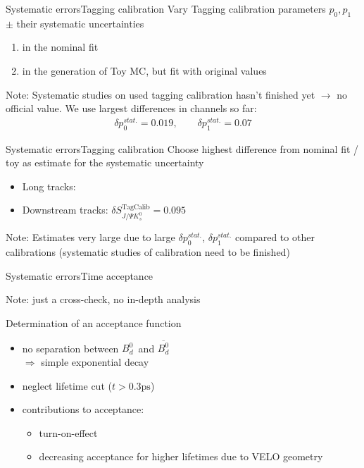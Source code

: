\documentclass{beamer}
\newcommand{\Bd}{$B_d^0$}
\newcommand{\Bdbar}{$\overline{B_d^0}$}
\newcommand{\SJPsi}{S_{J/\Psi K_s^0}}
\begin{document}
	\begin{frame}{Systematic errors}{Tagging calibration}
	Vary Tagging calibration parameters $p_0, p_1$ $\pm$ their systematic uncertainties
	\begin{enumerate}
	\item in the nominal fit
	\item in the generation of Toy MC, but fit with original values
	\end{enumerate}
	\begin{alert}{Note:}
	Systematic studies on used tagging calibration hasn't finished yet $\longrightarrow$ no official value. We use largest differences in channels so far:
	\begin{align*}
	\delta p_0^{stat.} = 0.019, \qquad \delta p_1^{stat.} = 0.07
	\end{align*}
	\end{alert}
	\end{frame}
	
	\begin{frame}{Systematic errors}{Tagging calibration}
	Choose highest difference from nominal fit / toy as estimate for the systematic uncertainty
	\begin{itemize}
	\item Long tracks:
	\item Downstream tracks: $\delta\SJPsi^{\text{TagCalib}} = 0.095$
    \end{itemize}		    
    \begin{alert}{Note:}
    Estimates very large due to large $\delta p_0^{stat.}$, $\delta p_1^{stat.}$ compared to other calibrations (systematic studies of calibration need to be finished)
    \end{alert}
    \end{frame}
    
    \begin{frame}{Systematic errors}{Time acceptance}
    \begin{alert}{Note:}
    just a cross-check, no in-depth analysis
    \end{alert}
    \begin{block}{Determination of an acceptance function}
    \begin{itemize}
    \item no separation between \Bd \ and \Bdbar \\
          $\Rightarrow$ simple exponential decay
    \item neglect lifetime cut ($t > 0.3\text{ps}$)
    \item contributions to acceptance:
          \begin{itemize}
          \item turn-on-effect
          \item decreasing acceptance for higher lifetimes due to VELO geometry
          \end{itemize}
    \end{itemize}
    \end{block}
\end{frame}
\end{document}
